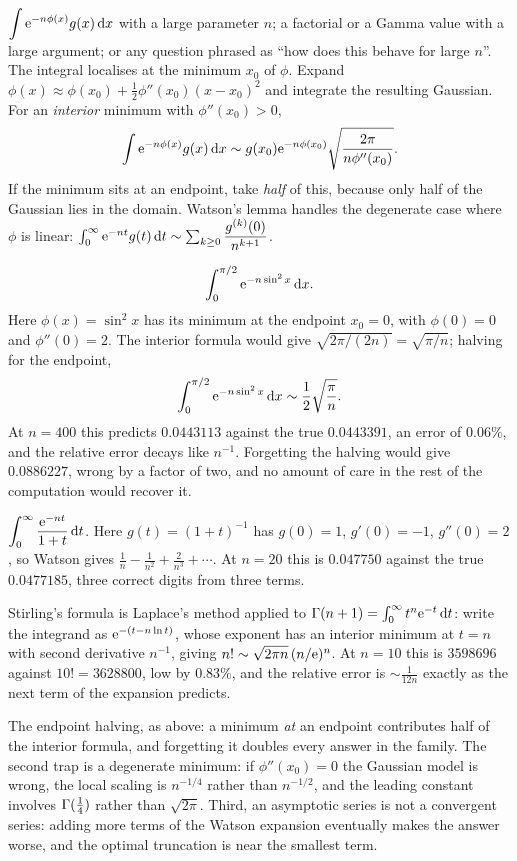 \cue $\displaystyle\int\mathrm{e}^{-n\phi(x)}g(x)\,\mathrm{d} x$ with a large parameter $n$; a factorial or a Gamma value with a large argument; or any question phrased as ``how does this behave for large $n$''.
\method The integral localises at the minimum $x_{0}$ of $\phi$. Expand $\phi(x)\approx\phi(x_{0})+\tfrac12\phi''(x_{0})(x-x_{0})^{2}$ and integrate the resulting Gaussian. For an \emph{interior} minimum with $\phi''(x_{0})>0$,
\[\int\mathrm{e}^{-n\phi(x)}g(x)\,\mathrm{d} x\sim g(x_{0})\mathrm{e}^{-n\phi(x_{0})}\sqrt{\frac{2\pi}{n\phi''(x_{0})}}.\]
If the minimum sits at an endpoint, take \emph{half} of this, because only half of the Gaussian lies in the domain. Watson's lemma handles the degenerate case where $\phi$ is linear: $\int_0^{\infty}\mathrm{e}^{-nt}g(t)\,\mathrm{d} t\sim\sum_{k\geq0}\dfrac{g^{(k)}(0)}{n^{k+1}}$.

\begin{worked}
\[\int_0^{\pi/2}\mathrm{e}^{-n\sin^{2}x}\,\mathrm{d} x.\]
Here $\phi(x)=\sin^{2}x$ has its minimum at the endpoint $x_{0}=0$, with $\phi(0)=0$ and $\phi''(0)=2$. The interior formula would give $\sqrt{2\pi/(2n)}=\sqrt{\pi/n}$; halving for the endpoint,
\[\int_0^{\pi/2}\mathrm{e}^{-n\sin^{2}x}\,\mathrm{d} x\sim\frac12\sqrt{\frac{\pi}{n}}.\]
At $n=400$ this predicts $0.0443113$ against the true $0.0443391$, an error of $0.06\%$, and the relative error decays like $n^{-1}$. Forgetting the halving would give $0.0886227$, wrong by a factor of two, and no amount of care in the rest of the computation would recover it.
\end{worked}

\begin{worked}
$\displaystyle\int_0^{\infty}\frac{\mathrm{e}^{-nt}}{1+t}\,\mathrm{d} t$. Here $g(t)=(1+t)^{-1}$ has $g(0)=1$, $g'(0)=-1$, $g''(0)=2$, so Watson gives $\tfrac1n-\tfrac{1}{n^{2}}+\tfrac{2}{n^{3}}+\cdots$. At $n=20$ this is $0.047750$ against the true $0.0477185$, three correct digits from three terms.

Stirling's formula is Laplace's method applied to $\Gamma(n+1)=\int_0^{\infty}t^{n}\mathrm{e}^{-t}\,\mathrm{d} t$: write the integrand as $\mathrm{e}^{-(t-n\ln t)}$, whose exponent has an interior minimum at $t=n$ with second derivative $n^{-1}$, giving $n!\sim\sqrt{2\pi n}\,(n/\mathrm{e})^{n}$. At $n=10$ this is $3598696$ against $10!=3628800$, low by $0.83\%$, and the relative error is $\sim\tfrac{1}{12n}$ exactly as the next term of the expansion predicts.
\end{worked}

\begin{trap}
The endpoint halving, as above: a minimum \emph{at} an endpoint contributes half of the interior formula, and forgetting it doubles every answer in the family. The second trap is a degenerate minimum: if $\phi''(x_{0})=0$ the Gaussian model is wrong, the local scaling is $n^{-1/4}$ rather than $n^{-1/2}$, and the leading constant involves $\Gamma(\tfrac14)$ rather than $\sqrt{2\pi}$. Third, an asymptotic series is not a convergent series: adding more terms of the Watson expansion eventually makes the answer worse, and the optimal truncation is near the smallest term.
\end{trap}

